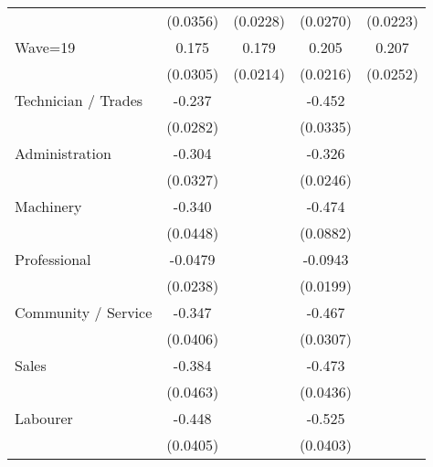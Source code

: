 {\begin{tabular}{l*{4}{c}}
                    &    (0.0356)         &    (0.0228)         &    (0.0270)         &    (0.0223)         \\
[1em]
Wave=19             &       0.175\sym{***}&       0.179\sym{***}&       0.205\sym{***}&       0.207\sym{***}\\
                    &    (0.0305)         &    (0.0214)         &    (0.0216)         &    (0.0252)         \\
[1em]
Technician / Trades &      -0.237\sym{***}&                     &      -0.452\sym{***}&                     \\
                    &    (0.0282)         &                     &    (0.0335)         &                     \\
[1em]
Administration      &      -0.304\sym{***}&                     &      -0.326\sym{***}&                     \\
                    &    (0.0327)         &                     &    (0.0246)         &                     \\
[1em]
Machinery           &      -0.340\sym{***}&                     &      -0.474\sym{***}&                     \\
                    &    (0.0448)         &                     &    (0.0882)         &                     \\
[1em]
Professional        &     -0.0479\sym{*}  &                     &     -0.0943\sym{***}&                     \\
                    &    (0.0238)         &                     &    (0.0199)         &                     \\
[1em]
Community / Service &      -0.347\sym{***}&                     &      -0.467\sym{***}&                     \\
                    &    (0.0406)         &                     &    (0.0307)         &                     \\
[1em]
Sales               &      -0.384\sym{***}&                     &      -0.473\sym{***}&                     \\
                    &    (0.0463)         &                     &    (0.0436)         &                     \\
[1em]
Labourer            &      -0.448\sym{***}&                     &      -0.525\sym{***}&                     \\
                    &    (0.0405)         &                     &    (0.0403)         &                     \\

\end{tabular}}
